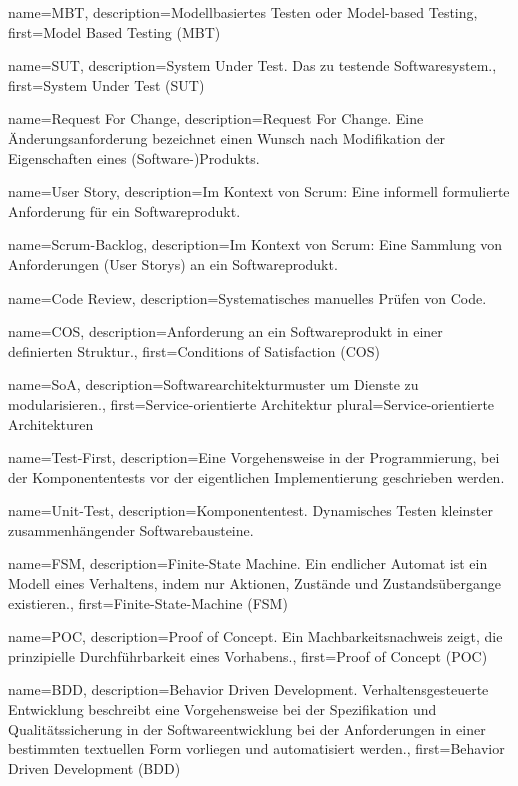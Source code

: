  {
	name={MBT},
	description={Modellbasiertes Testen oder Model-based Testing},
	first={Model Based Testing (MBT)}
}

 {
	name={SUT},
	description={System Under Test. Das zu testende Softwaresystem.},
	first={System Under Test (SUT)}
}

 {
	name={Request For Change},
	description={Request For Change. Eine Änderungsanforderung bezeichnet einen  Wunsch nach Modifikation der Eigenschaften eines (Software-)Produkts.}
}

 {
	name={User Story},
	description={Im Kontext von Scrum: Eine informell formulierte Anforderung für ein Softwareprodukt.}
}

 {
	name={Scrum-Backlog},
	description={Im Kontext von Scrum: Eine Sammlung von Anforderungen (User Storys) an ein Softwareprodukt.}
}

 {
	name={Code Review},
	description={Systematisches manuelles Prüfen von Code.}
}

 {
	name={COS},
	description={Anforderung an ein Softwareprodukt in einer definierten Struktur.},
	first={Conditions of Satisfaction (COS)}
}

 {
	name={SoA},
	description={Softwarearchitekturmuster um Dienste zu modularisieren.},
	first={Service-orientierte Architektur}
	plural={Service-orientierte Architekturen}
}

 {
	name={Test-First},
	description={Eine Vorgehensweise in der Programmierung, bei der Komponententests vor der eigentlichen Implementierung geschrieben werden.}
}

 {
	name={Unit-Test},
	description={Komponententest. Dynamisches Testen kleinster zusammenhängender Softwarebausteine.}
}

 {
	name={FSM},
	description={Finite-State Machine. Ein endlicher Automat ist ein Modell eines Verhaltens, indem nur Aktionen, Zustände und Zustandsübergange existieren.},
	first={Finite-State-Machine (FSM)}
}

 {
	name={POC},
	description={Proof of Concept. Ein Machbarkeitsnachweis zeigt, die prinzipielle Durchführbarkeit eines Vorhabens.},
	first={Proof of Concept (POC)}
}

 {
	name={BDD},
	description={Behavior Driven Development. Verhaltensgesteuerte Entwicklung beschreibt eine Vorgehensweise bei der Spezifikation und Qualitätssicherung in der Softwareentwicklung bei der Anforderungen in einer bestimmten textuellen Form vorliegen und automatisiert werden.},
	first={Behavior Driven Development (BDD)}
}

